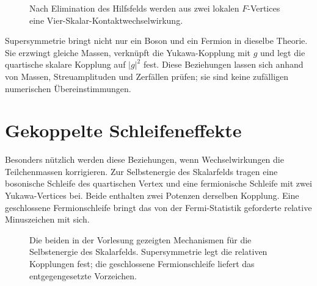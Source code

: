 \begin{figure}[H]
\centering
{}
\caption{Nach Elimination des Hilfsfelds werden aus zwei lokalen \(F\)-Vertices eine Vier-Skalar-Kontaktwechselwirkung.}
\end{figure}

Supersymmetrie bringt nicht nur ein Boson und ein Fermion in dieselbe Theorie. Sie erzwingt gleiche Massen, verknüpft die Yukawa-Kopplung mit \(g\) und legt die quartische skalare Kopplung auf \(|g|^2\) fest. Diese Beziehungen lassen sich anhand von Massen, Streuamplituden und Zerfällen prüfen; sie sind keine zufälligen numerischen Übereinstimmungen.

\section{Gekoppelte Schleifeneffekte}

Besonders nützlich werden diese Beziehungen, wenn Wechselwirkungen die Teilchenmassen korrigieren. Zur Selbstenergie des Skalarfelds tragen eine bosonische Schleife des quartischen Vertex und eine fermionische Schleife mit zwei Yukawa-Vertices bei. Beide enthalten zwei Potenzen derselben Kopplung. Eine geschlossene Fermionschleife bringt das von der Fermi-Statistik geforderte relative Minuszeichen mit sich.

\begin{figure}[H]
\centering
{}
\caption{Die beiden in der Vorlesung gezeigten Mechanismen für die Selbstenergie des Skalarfelds. Supersymmetrie legt die relativen Kopplungen fest; die geschlossene Fermionschleife liefert das entgegengesetzte Vorzeichen.}
\end{figure}

